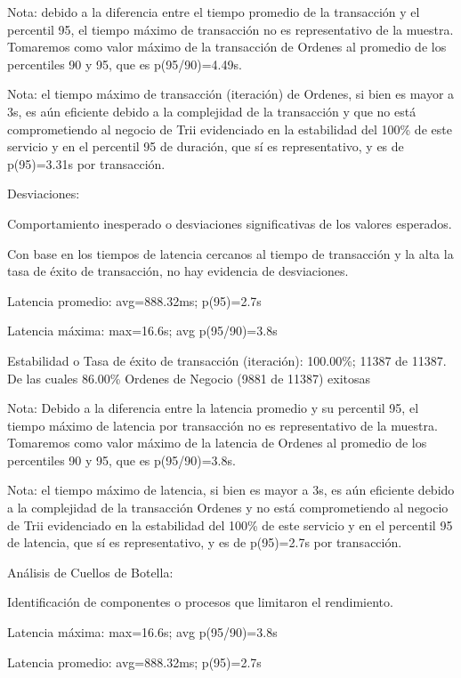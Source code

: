 \documentclass[
  paper=a4,
  ,captions=tableheading
]{scrartcl}
\renewenvironment{quote}{\begin{customblockquote}\list{}{\rightmargin=0em\leftmargin=0em}%
\item\relax\color{blockquote-text}\ignorespaces}{\unskip\unskip\endlist\end{customblockquote}}
\begin{document}
Nota: debido a la diferencia entre el tiempo promedio de la transacción
y el percentil 95, el tiempo máximo de transacción no es representativo
de la muestra. Tomaremos como valor máximo de la transacción de Ordenes
al promedio de los percentiles 90 y 95, que es p(95/90)=4.49s.

Nota: el tiempo máximo de transacción (iteración) de Ordenes, si bien es
mayor a 3s, es aún eficiente debido a la complejidad de la transacción y
que no está comprometiendo al negocio de Trii evidenciado en la
estabilidad del 100\% de este servicio y en el percentil 95 de duración,
que sí es representativo, y es de p(95)=3.31s por transacción.

Desviaciones:

Comportamiento inesperado o desviaciones significativas de los valores
esperados.

Con base en los tiempos de latencia cercanos al tiempo de transacción y
la alta la tasa de éxito de transacción, no hay evidencia de
desviaciones.

\begin{quote}
Latencia promedio: avg=888.32ms; p(95)=2.7s

Latencia máxima: max=16.6s; avg p(95/90)=3.8s

Estabilidad o Tasa de éxito de transacción (iteración): 100.00\%; 11387
de 11387. De las cuales 86.00\% Ordenes de Negocio (9881 de 11387)
exitosas
\end{quote}

Nota: Debido a la diferencia entre la latencia promedio y su percentil
95, el tiempo máximo de latencia por transacción no es representativo de
la muestra. Tomaremos como valor máximo de la latencia de Ordenes al
promedio de los percentiles 90 y 95, que es p(95/90)=3.8s.

Nota: el tiempo máximo de latencia, si bien es mayor a 3s, es aún
eficiente debido a la complejidad de la transacción Ordenes y no está
comprometiendo al negocio de Trii evidenciado en la estabilidad del
100\% de este servicio y en el percentil 95 de latencia, que sí es
representativo, y es de p(95)=2.7s por transacción.

Análisis de Cuellos de Botella:

Identificación de componentes o procesos que limitaron el rendimiento.

\begin{quote}
Latencia máxima: max=16.6s; avg p(95/90)=3.8s

Latencia promedio: avg=888.32ms; p(95)=2.7s
\end{quote}
\end{document}
